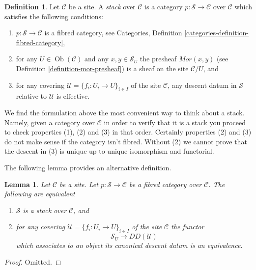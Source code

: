 \documentclass{stacks-project}
\theoremstyle{plain}
\newtheorem{lemma}[subsection]{Lemma}
\theoremstyle{definition}
\newtheorem{definition}[subsection]{Definition}
\theoremstyle{remark}
\numberwithin{equation}{subsection}
\def\Ob{\mathop{\mathrm{Ob}}\nolimits}
\begin{document}
\begin{definition}
\label{definition-stack}
Let $\mathcal{C}$ be a site. A {\it stack} over $\mathcal{C}$
is a category $p : \mathcal{S} \to \mathcal{C}$ over $\mathcal{C}$ which
satisfies the following conditions:
\begin{enumerate}
\item $p : \mathcal{S} \to \mathcal{C}$ is a fibred category, see
Categories, Definition \ref{categories-definition-fibred-category},
\item for any $U \in \Ob(\mathcal{C})$ and any $x, y \in \mathcal{S}_U$
the presheaf $\mathit{Mor}(x, y)$ (see
Definition \ref{definition-mor-presheaf}) is a sheaf on
the site $\mathcal{C}/U$, and
\item for any covering $\mathcal{U} = \{f_i : U_i \to U\}_{i \in I}$
of the site $\mathcal{C}$, any descent datum in $\mathcal{S}$
relative to $\mathcal{U}$ is effective.
\end{enumerate}
\end{definition}

\noindent
We find the formulation above the most convenient way to think about
a stack. Namely, given a category over $\mathcal{C}$ in order to verify
that it is a stack you proceed to check properties (1), (2) and
(3) in that order. Certainly properties (2) and (3) do not make sense
if the category isn't fibred. Without (2) we cannot prove that the
descent in (3) is unique up to unique isomorphism and functorial.

\medskip\noindent
The following lemma provides an alternative definition.

\begin{lemma}
\label{lemma-stack-equivalences}
Let $\mathcal{C}$ be a site.
Let $p : \mathcal{S} \to \mathcal{C}$ be a fibred category
over $\mathcal{C}$. The following are equivalent
\begin{enumerate}
\item $\mathcal{S}$ is a stack over $\mathcal{C}$, and
\item for any covering $\mathcal{U} = \{f_i : U_i \to U\}_{i \in I}$
of the site $\mathcal{C}$ the functor
$$
\mathcal{S}_U \longrightarrow DD(\mathcal{U})
$$
which associates to an
object its canonical descent datum is an equivalence.
\end{enumerate}
\end{lemma}

\begin{proof}
Omitted.
\end{proof}
\end{document}

